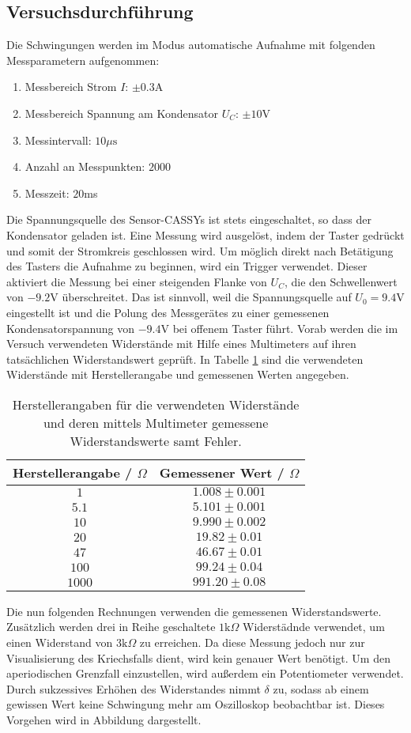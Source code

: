 \documentclass[a4paper, 12pt]{scrartcl}
\begin{document}
\subsection{Versuchsdurchführung}

Die Schwingungen werden im Modus \glqq automatische Aufnahme\grqq{} mit folgenden Messparametern aufgenommen:
\begin{enumerate}[-]
\item Messbereich Strom $I$: $\pm 0.3$A
\item Messbereich Spannung am Kondensator $U_C$: $\pm 10$V
\item Messintervall: $10\mu\text{s}$
\item Anzahl an Messpunkten: $2000$
\item Messzeit: $20$ms
\end{enumerate}
Die Spannungsquelle des Sensor-CASSYs ist stets eingeschaltet, so dass der Kondensator geladen ist. Eine Messung wird ausgelöst, indem der Taster gedrückt und somit der Stromkreis geschlossen wird. Um möglich direkt nach Betätigung des Tasters die Aufnahme zu beginnen, wird ein Trigger verwendet. Dieser aktiviert die Messung bei einer steigenden Flanke von $U_C$, die den Schwellenwert von $-9.2$V überschreitet. Das ist sinnvoll, weil die Spannungsquelle auf $U_0 = 9.4$V eingestellt ist und die Polung des Messgerätes zu einer gemessenen Kondensatorspannung von $-9.4$V bei offenem Taster führt. 
Vorab werden die im Versuch verwendeten Widerstände mit Hilfe eines Multimeters auf ihren tatsächlichen Widerstandswert geprüft. In Tabelle \ref{tab:widerstaende} sind die verwendeten Widerstände mit Herstellerangabe und gemessenen Werten angegeben.

\begin{table}[H]
\centering
\begin{tabular}{c|c}
Herstellerangabe / $\Omega$ & Gemessener Wert / $\Omega$ \\
\hline
$1$ & $1.008 \pm 0.001$ \\
$5.1$ & $5.101 \pm 0.001$ \\
$10$ & $9.990 \pm 0.002$ \\
$20$ & $19.82 \pm 0.01$ \\
$47$ & $46.67 \pm 0.01$ \\
$100$ & $99.24 \pm 0.04$ \\
$1000$ & $991.20\pm 0.08$
\end{tabular}
\caption{Herstellerangaben für die verwendeten Widerstände und deren mittels Multimeter gemessene Widerstandswerte samt Fehler.}
\label{tab:widerstaende}
\end{table}
Die nun folgenden Rechnungen verwenden die gemessenen Widerstandswerte. Zusätzlich werden drei in Reihe geschaltete $1\text{k}\Omega$ Widerstädnde verwendet, um einen Widerstand von $3\text{k}\Omega$ zu erreichen. Da diese Messung jedoch nur zur Visualisierung des Kriechsfalls dient, wird kein genauer Wert benötigt. Um den aperiodischen Grenzfall einzustellen, wird außerdem ein Potentiometer verwendet. Durch sukzessives Erhöhen des Widerstandes nimmt $\delta$ zu, sodass ab einem gewissen Wert keine Schwingung mehr am Oszilloskop beobachtbar ist. Dieses Vorgehen wird in Abbildung dargestellt.
\end{document}
